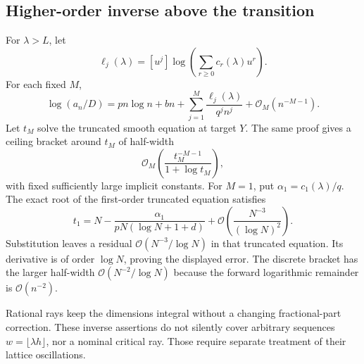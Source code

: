 \documentclass[11pt,letterpaper]{article}
\numberwithin{equation}{section}
\theoremstyle{remark}\newtheorem{remark}[theorem]{Remark}
\newcommand{\Oh}{\mathcal O}\newcommand{\Q}{\mathbb Q}\newcommand{\N}{\mathbb N}\newcommand{\R}{\mathbb R}
\begin{document}
\subsection{Higher-order inverse above the transition}
For $\lambda>L$, let
\[
\ell_j(\lambda)=[u^j]\log\left(\sum_{r\ge0}c_r(\lambda)u^r\right).
\]
For each fixed $M$,
\begin{equation}\label{mdk:asp:eq:lograyM}
\log(a_n/D)=pn\log n+bn+
\sum_{j=1}^M\frac{\ell_j(\lambda)}{q^jn^j}+\Oh_M(n^{-M-1}).
\end{equation}
Let $t_M$ solve the truncated smooth equation at target $Y$. The same proof gives a ceiling bracket around $t_M$ of half-width
\[
\Oh_M\left(\frac{t_M^{-M-1}}{1+\log t_M}\right),
\]
with fixed sufficiently large implicit constants. For $M=1$, put $\alpha_1=c_1(\lambda)/q$. The exact root of the first-order truncated equation satisfies
\begin{equation}\label{mdk:asp:eq:t1}
t_1=N-\frac{\alpha_1}{pN(\log N+1+d)}
+\Oh\left(\frac{N^{-3}}{(\log N)^2}\right).
\end{equation}
Substitution leaves a residual $\Oh(N^{-3}/\log N)$ in that truncated equation. Its derivative is of order $\log N$, proving the displayed error. The discrete bracket has the larger half-width $\Oh(N^{-2}/\log N)$ because the forward logarithmic remainder is $\Oh(n^{-2})$.

Rational rays keep the dimensions integral without a changing fractional-part correction. These inverse assertions do not silently cover arbitrary sequences $w=\lfloor\lambda h\rfloor$, nor a nominal critical ray. Those require separate treatment of their lattice oscillations.

\appendix
\end{document}
